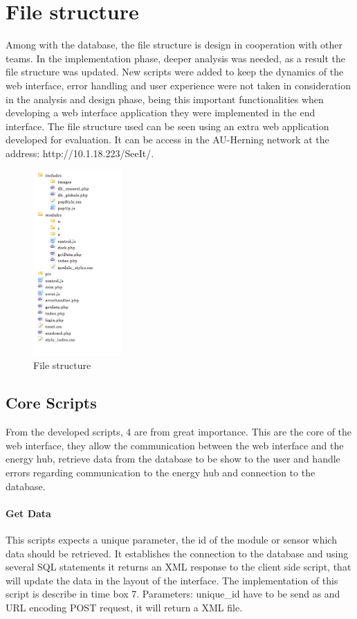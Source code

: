 \section{File structure}
Among with the database, the file structure is design in cooperation with other teams. In the implementation phase, deeper analysis was needed, as a result the file structure was updated. New scripts were added to keep the dynamics of the web interface, error handling and user experience were not taken in consideration in the analysis and design phase, being this important functionalities when developing a web interface application they were implemented in the end interface.
\p
The file structure used can be seen using an extra web application developed for evaluation. It can be access in the AU-Herning network at the address: http://10.1.18.223/SeeIt/.
\begin{figure}[H]
	\begin{centering}
		\includegraphics[width=0.3\textwidth]{images/file_structure.png}
		\caption{File structure}
	\end{centering}
\end{figure}
%
\subsection{Core Scripts}
From the developed scripts, 4 are from great importance. This are the core of the web interface, they allow the communication between the web interface and the energy hub, retrieve data from the database to be show to the user and handle errors regarding communication to the energy hub and connection to the database.

\paragraph{Get Data}
This scripts expects a unique parameter, the id of the module or sensor which data should be retrieved. It establishes the connection to the database and using several SQL statements it returns an XML response to the client side script, that will update the data in the layout of the interface. The implementation of this script is describe in time box 7.
\p
Parameters: unique\_id have to be send as and URL encoding POST request, it will return a XML file.
